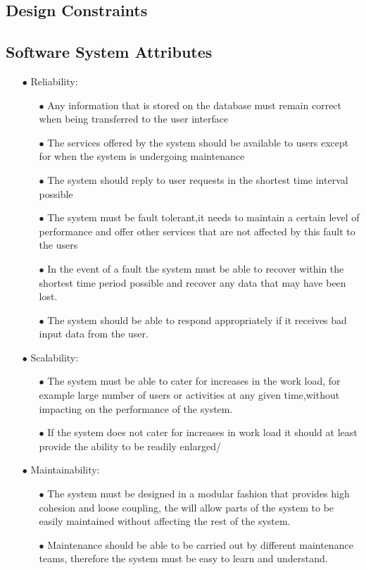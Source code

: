\documentclass[a4paper,12pt]{article}
\begin{document}
\subsection{Design Constraints}
\subsection{Software System Attributes}
\begin{itemize}
\item[$\bullet$]Reliability:
	\begin{itemize}
		\item[$\bullet$] Any information that is stored on the database must remain correct 
		when being transferred to the user interface 
		\item[$\bullet$] The services offered by the system should be available to users except 
		for when the system is undergoing maintenance 
		\item[$\bullet$] The system should reply to user requests in the shortest time interval possible 
		\item[$\bullet$] The system must be fault tolerant,it needs to maintain a certain level of 
		performance and offer other services that are not affected by this fault to the users 
		\item[$\bullet$] In the event of a fault the system must be able to recover within the shortest
		time period possible and recover any data that may have been lost.
		\item[$\bullet$] The system should be able to respond appropriately if it receives  bad input data from the 
		user.			 
	\end{itemize}
 
\item[$\bullet$] Scalability:
	\begin{itemize}
		\item[$\bullet$] The system must be able to cater for increases in the work load, 
		for example large number of users or activities at any given time,without impacting on the 
		performance of the system.
		 \item[$\bullet$] If the system does not cater for increases in work load it should at least 
		 provide the ability to be readily enlarged/ 
	\end{itemize}
	
\item[$\bullet$] Maintainability:
	\begin{itemize}
		\item[$\bullet$] The system must be designed in a modular fashion that provides high cohesion and
		loose coupling, the will allow parts of the system to be easily maintained without affecting the rest 
		of the system.
		\item[$\bullet$] Maintenance should be able to be carried out by different maintenance teams, therefore
		the system must be easy to learn and understand.
	\end{itemize}


\end{itemize}
\end{document}
